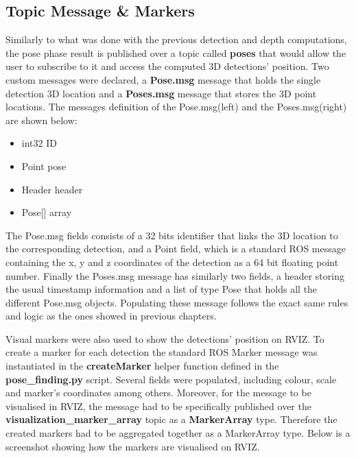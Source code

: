 \subsection{Topic Message \& Markers}

Similarly to what was done with the previous detection and depth computations, the pose phase result is published over a topic called \textbf{poses} that would allow the user to subscribe to it and access the computed 3D detections' position. Two custom messages were declared, a \textbf{Pose.msg} message that holds the single detection 3D location and a \textbf{Poses.msg} message that stores the 3D point locations. The messages definition of the Pose.msg(left) and the Poses.msg(right) are shown below:

\begin{multicols}{2}
  \begin{itemize}
    \item int32 ID
    \item Point pose
  \end{itemize}

  \columnbreak

  \begin{itemize}
    \item Header header
    \item Pose[] array
  \end{itemize}
\end{multicols}

The Pose.msg fields consists of a 32 bits identifier that links the 3D location to the corresponding detection, and a Point field, which is a standard ROS message containing the x, y and z coordinates of the detection as a 64 bit floating point number. Finally the Poses.msg message has similarly two fields, a header storing the usual timestamp information and a list of type Pose that holds all the different Pose.msg objects. Populating these message follows the exact same rules and logic as the ones showed in previous chapters.

Visual markers were also used to show the detections' position on RVIZ. To create a marker for each detection the standard ROS Marker message was instantiated in the \textbf{createMarker} helper function defined in the \textbf{pose\_finding.py} script. Several fields were populated, including colour, scale and marker's coordinates among others. Moreover, for the message to be visualised in RVIZ, the message had to be specifically published over the \textbf{visualization\_marker\_array} topic as a \textbf{MarkerArray} type. Therefore the created markers had to be aggregated together as a MarkerArray type. Below is a screenshot showing how the markers are visualised on RVIZ.

